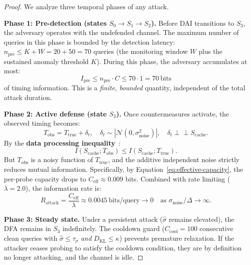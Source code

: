\documentclass[11pt]{article}
\begin{document}
\begin{proof}
We analyze three temporal phases of any attack.

\medskip
\noindent\textbf{Phase 1: Pre-detection (states $S_0 \to S_1 \to S_2$).}
Before DAI transitions to $S_3$, the adversary operates with the undefended channel.
The maximum number of queries in this phase is bounded by the detection latency:
$n_{\mathrm{pre}} \leq K + W = 20 + 50 = 70$ queries (the monitoring window $W$ plus
the sustained anomaly threshold $K$). During this phase, the adversary accumulates at most:
\begin{equation}
    I_{\mathrm{pre}} \leq n_{\mathrm{pre}} \cdot C \leq 70 \cdot 1 = 70~\text{bits}
\end{equation}
of timing information. This is a \emph{finite, bounded} quantity, independent of the
total attack duration.

\medskip
\noindent\textbf{Phase 2: Active defense (state $S_3$).}
Once countermeasures activate, the observed timing becomes:
\begin{equation}
    T_{\mathrm{obs}} = T_{\mathrm{true}} + \delta_t, \quad \delta_t \sim |\mathcal{N}(0, \sigma_{\mathrm{noise}}^2)|,
    \quad \delta_t \perp\!\!\!\perp S_{\mathrm{cache}}.
\end{equation}
By the \textbf{data processing inequality}~\cite{cover2006elements}:
\begin{equation}
    I(S_{\mathrm{cache}}; T_{\mathrm{obs}}) \leq I(S_{\mathrm{cache}}; T_{\mathrm{true}}).
\end{equation}
But $T_{\mathrm{obs}}$ is a noisy function of $T_{\mathrm{true}}$, and the additive
independent noise strictly reduces mutual information. Specifically, by
Equation~\eqref{eq:effective-capacity}, the per-probe capacity drops to
$C_{\mathrm{eff}} \approx 0.009$ bits. Combined with rate limiting ($\lambda = 2.0$),
the information rate is:
\begin{equation}
    R_{\mathrm{attack}} = \frac{C_{\mathrm{eff}}}{\lambda} \approx 0.0045~\text{bits/query} \to 0
    \quad \text{as } \sigma_{\mathrm{noise}} / \Delta \to \infty.
\end{equation}

\medskip
\noindent\textbf{Phase 3: Steady state.}
Under a persistent attack ($\hat{\sigma}$ remains elevated), the DFA remains in $S_3$
indefinitely. The cooldown guard ($C_{\mathrm{cool}} = 100$ consecutive clean queries
with $\hat{\sigma} \leq \tau_\sigma$ \emph{and} $D_{\mathrm{KL}} \leq \kappa$) prevents
premature relaxation. If the attacker ceases probing to satisfy the cooldown condition,
they are by definition no longer attacking, and the channel is idle.


\end{proof}
\end{document}
